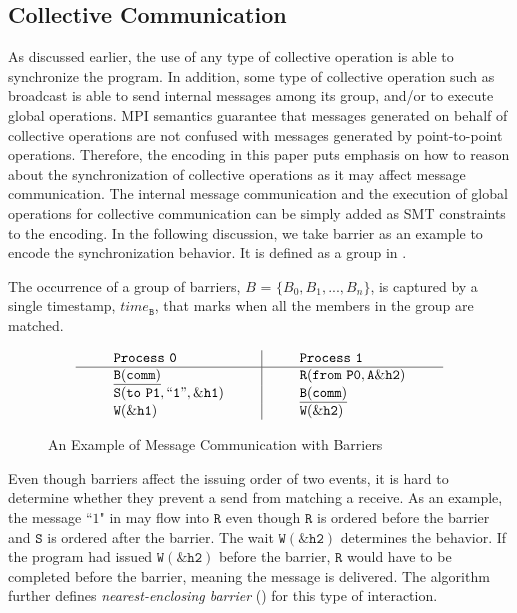 \subsection{Collective Communication}
As discussed earlier, the use of any type of collective operation is able to synchronize the program. In addition, some type of collective operation such as broadcast is able to send internal messages among its group, and/or to execute global operations. MPI semantics guarantee that messages generated on behalf of collective operations are not confused with messages generated by point-to-point operations. Therefore, the encoding in this paper puts emphasis on how to reason about the synchronization of collective operations as it may affect message communication. The internal message communication and the execution of global operations for collective communication can be simply added as SMT constraints to the encoding. In the following discussion, we take barrier as an example to encode the synchronization behavior. It is defined as a group in . 

\begin{definition}[Barrier]\label{def:barrier}
The occurrence of a group of barriers, $B$ = $\{B_0, B_1, ..., B_n\}$, is captured by a
single timestamp, $\mathit{time}_\mathtt{B}$, that marks when all the members in the group are matched.  
\end{definition}

\begin{figure}[h]
\[
\begin{array}{l|l}
\;\;\;\;\;\;\;\;\mathtt{Process\ 0}\;\;\;\;\;\;\;\; & \;\;\;\;\;\;\;\; \mathtt{Process\ 1}\;\;\;\;\;\;\;\; \\
\hline
\;\;\;\;\;\;\;\;\mathtt{\underline{B(comm)}}\;\;\;\;\;\;\;\; & \;\;\;\;\;\;\;\; \mathtt{R(from\ P0,A\&h2)}\;\;\;\;\;\;\;\; \\
\;\;\;\;\;\;\;\;\mathtt{S(to\ P1,``1",\&h1)}\;\;\;\;\;\;\;\; & \;\;\;\;\;\;\;\; \mathtt{\underline{B(comm)}}\;\;\;\;\;\;\;\; \\
\;\;\;\;\;\;\;\;\mathtt{W(\&h1)}\;\;\;\;\;\;\;\; & \;\;\;\;\;\;\;\; \mathtt{W(\&h2)}\;\;\;\;\;\;\;\; \\
\end{array}
\]
\caption{An Example of Message Communication with Barriers} \label{fig:mc_barrier1}
\end{figure}

Even though barriers affect the issuing order of two events, it is hard to determine whether they prevent a send from matching a receive. As an example, the message ``$1$" in  may flow into $\mathtt{R}$ even though $\mathtt{R}$ is ordered before the barrier and $\mathtt{S}$ is ordered after the barrier. The wait $\mathtt{W(\&h2)}$ determines the behavior. If the program had issued $\mathtt{W(\&h2)}$ before the barrier, $\mathtt{R}$ would have to be completed before the barrier, meaning the message is delivered. The algorithm further defines \textit{nearest-enclosing barrier} () for this type of interaction.

